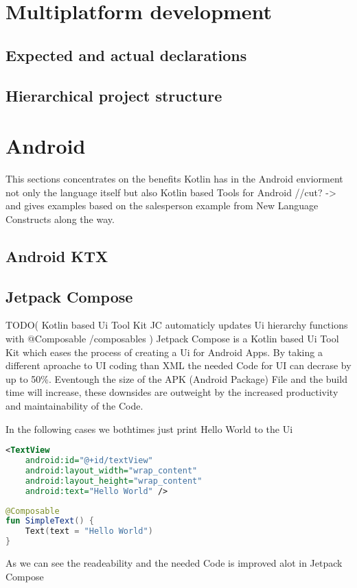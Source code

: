 \documentclass[a4paper, 11pt]{article}
\begin{document}
\section{Multiplatform development}
	\subsection{Expected and actual declarations}
	\subsection{Hierarchical project structure}

\section{Android}
	This sections concentrates on the benefits Kotlin has in the Android enviorment not only the language itself but also Kotlin based Tools for Android //cut? -> and gives examples based on the salesperson example from New Language Constructs along the way.
\subsection{Android KTX}

\subsection{Jetpack Compose}
  TODO(
  Kotlin based Ui Tool Kit 
  JC automaticly updates Ui hierarchy
  functions with @Composable /composables
  )
Jetpack Compose is a Kotlin based Ui Tool Kit which eases the process of creating a Ui for Android Apps. By taking a different aproache to UI coding than XML the needed Code for UI can decrase by up to 50\%. Eventough the size of the APK (Android Package) File and the build time will increase, these downsides are outweight by the increased productivity and maintainability of the Code.

In the following cases we bothtimes just print Hello World to the Ui
\begin{lstlisting}[language=xml, title= {XML Hello World}]
	<TextView
    android:id="@+id/textView"
    android:layout_width="wrap_content"
    android:layout_height="wrap_content"
    android:text="Hello World" />
 \end{lstlisting}
\begin{lstlisting}[language=Kotlin, title= {Jetpack Compose Hello World}]
@Composable
fun SimpleText() {
    Text(text = "Hello World")
}
 \end{lstlisting}
As we can see the readeability and the needed Code is improved alot in Jetpack Compose
\end{document}
